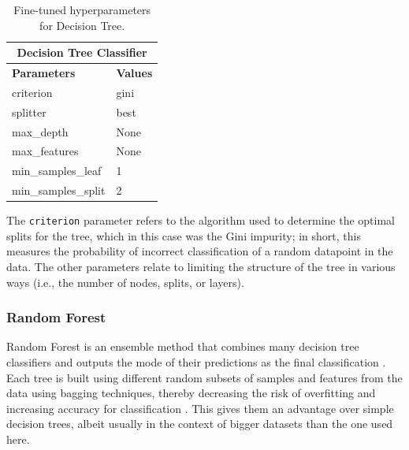 \documentclass[12pt,a4paper]{article}
\numberwithin{figure}{section}
\numberwithin{table}{section}
\numberwithin{definition}{section}
\begin{document}
\begin{table}[!h] 
  \centering\small
  \renewcommand{\arraystretch}{1.5} 
  \begin{tabular}{@{}ll@{}}
  \hline
  \multicolumn{2}{|c|}{\textbf{Decision Tree Classifier}} \\
  \hline
  \textbf{Parameters} & \textbf{Values} \\
  \hline
  criterion & gini \\
  splitter & best \\
  max\_depth & None \\
  max\_features & None \\
  min\_samples\_leaf & 1 \\
  min\_samples\_split & 2 \\
  \hline
  \end{tabular}
  \caption{Fine-tuned hyperparameters for Decision Tree.}
  \label{tbl:decisiontreeparams}
\end{table}

The \texttt{criterion} parameter refers to the algorithm used to determine the optimal splits for the tree, which in this case was the Gini impurity; in short, this measures the probability of incorrect classification of a random datapoint in the data. The other parameters relate to limiting the structure of the tree in various ways (i.e., the number of nodes, splits, or layers).

\subsubsection{Random Forest}
\label{ssec:randomforest}


Random Forest is an ensemble method that combines many decision tree classifiers and outputs the mode of their predictions as the final classification \parencite{Oktafiani2024article}. Each tree is built using different random subsets of samples and features from the data using bagging techniques, thereby decreasing the risk of overfitting and increasing accuracy for classification \parencite{Salman2024article,Oktafiani2024article}. This gives them an advantage over simple decision trees, albeit usually in the context of bigger datasets than the one used here.
\end{document}
